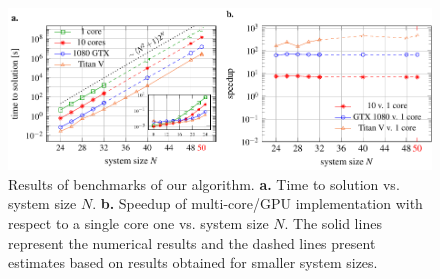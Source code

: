 \begin{figure}
    \centering
    \includegraphics[width=\textwidth]{figures/resultsplot_reduced.pdf}
    \caption{Results of benchmarks of our algorithm. {\textbf{a.}} Time to solution vs. system size $N$. {\textbf{b.}} Speedup of multi-core/GPU implementation with respect to a single core one vs. system size $N$. The solid lines represent the numerical results and the dashed lines present estimates based on results obtained for smaller system sizes.}
    \label{fig:benchmark_results}
\end{figure}
